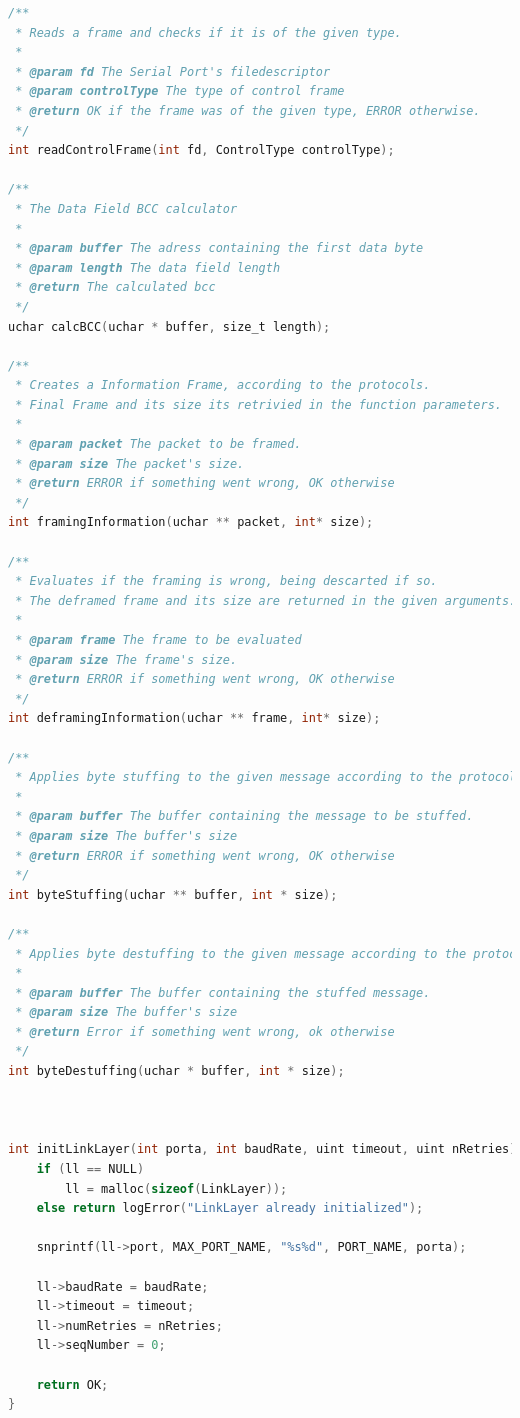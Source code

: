 \documentclass[a4paper, 11pt]{article}
\begin{document}
\begin{lstlisting}[language=C]
/**
 * Reads a frame and checks if it is of the given type.
 *
 * @param fd The Serial Port's filedescriptor
 * @param controlType The type of control frame
 * @return OK if the frame was of the given type, ERROR otherwise.
 */
int readControlFrame(int fd, ControlType controlType);

/**
 * The Data Field BCC calculator
 *
 * @param buffer The adress containing the first data byte
 * @param length The data field length
 * @return The calculated bcc
 */
uchar calcBCC(uchar * buffer, size_t length);

/**
 * Creates a Information Frame, according to the protocols.
 * Final Frame and its size its retrivied in the function parameters.
 *
 * @param packet The packet to be framed.
 * @param size The packet's size.
 * @return ERROR if something went wrong, OK otherwise
 */
int framingInformation(uchar ** packet, int* size);

/**
 * Evaluates if the framing is wrong, being descarted if so.
 * The deframed frame and its size are returned in the given arguments.
 *
 * @param frame The frame to be evaluated
 * @param size The frame's size.
 * @return ERROR if something went wrong, OK otherwise
 */
int deframingInformation(uchar ** frame, int* size);

/**
 * Applies byte stuffing to the given message according to the protocols, retriving the new message in the same buffer.
 *
 * @param buffer The buffer containing the message to be stuffed.
 * @param size The buffer's size
 * @return ERROR if something went wrong, OK otherwise
 */
int byteStuffing(uchar ** buffer, int * size);

/**
 * Applies byte destuffing to the given message according to the protocols, retriving the new message in the same buffer.
 *
 * @param buffer The buffer containing the stuffed message.
 * @param size The buffer's size
 * @return Error if something went wrong, ok otherwise
 */
int byteDestuffing(uchar * buffer, int * size);



int initLinkLayer(int porta, int baudRate, uint timeout, uint nRetries) {
	if (ll == NULL)
		ll = malloc(sizeof(LinkLayer));
	else return logError("LinkLayer already initialized");

	snprintf(ll->port, MAX_PORT_NAME, "%s%d", PORT_NAME, porta);

	ll->baudRate = baudRate;
	ll->timeout = timeout;
	ll->numRetries = nRetries;
	ll->seqNumber = 0;

	return OK;
}


\end{lstlisting}
\end{document}
